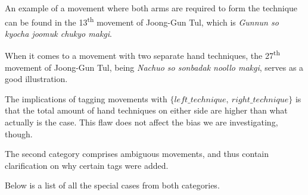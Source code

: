 \documentclass[10pt,twocolumn,a4paper]{article}
\begin{document}
  An example of a movement where both arms are required to form the technique
  can be found in the 13\textsuperscript{th} movement of Joong-Gun Tul, which
  is \emph{Gunnun so kyocha joomuk chukyo makgi}.

  When it comes to a movement with two separate hand techniques, the
  27\textsuperscript{th} movement of Joong-Gun Tul, being \emph{Nachuo so
  sonbadak noollo makgi}, serves as a good illustration.

  The implications of tagging movements with $\{left\_technique, \:
  right\_technique\}$ is that the total amount of hand techniques on either
  side are higher than what actually is the case. This flaw does not affect
  the bias we are investigating, though.

  The second category comprises ambiguous movements, and thus contain
  clarification on why certain tags were added.

  Below is a list of all the special cases from both categories.
\end{document}

